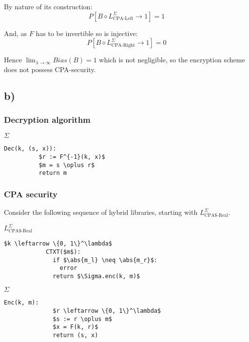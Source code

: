 \documentclass[a4paper]{scrreprt}
\DeclarePairedDelimiter\abs{\lvert}{\rvert}
\begin{document}
By nature of its construction:
\[
	P[B \diamond L^{\Sigma}_{\text{CPA-Left}} \rightarrow 1] = 1
\]

And, as $F$ has to be invertible so is injective:
\[
	P[B \diamond L^{\Sigma}_{\text{CPA-Right}} \rightarrow 1] = 0
\]

Hence $\lim_{\lambda \to \infty} Bias(B) = 1$ which is not negligible,
so the encryption scheme does not possess CPA-security.

\subsection{b)}

\subsubsection{Decryption algorithm}

\begin{library}{$\Sigma$}
	\begin{lstlisting}[mathescape=true,autogobble=true]
		Dec(k, (s, x)):
		  $r := F^{-1}(k, x)$
		  $m = s \oplus r$
		  return m
	\end{lstlisting}
\end{library}

\subsubsection{CPA security}

Consider the following sequence of hybrid libraries, starting with
$L^{\Sigma}_{\text{CPA\$-Real}}$.

\begin{tcbraster}[raster columns=2,raster equal height,nobeforeafter,raster column skip=2cm]
	\begin{library}{$L^{\Sigma}_{\text{CPA\$-Real}}$}
		\begin{lstlisting}[mathescape=true,autogobble=true]
			$k \leftarrow \{0, 1\}^\lambda$
			CTXT($m$):
			  if $\abs{m_l} \neq \abs{m_r}$:
			    error
			  return $\Sigma.enc(k, m)$
		\end{lstlisting}
	\end{library}
	\begin{library}{$\Sigma$}
		\begin{lstlisting}[mathescape=true,autogobble=true]
			Enc(k, m):
			  $r \leftarrow \{0, 1\}^\lambda$
			  $s := r \oplus m$
			  $x = F(k, r)$
			  return (s, x)
		\end{lstlisting}
	\end{library}
\end{tcbraster}
\end{document}
